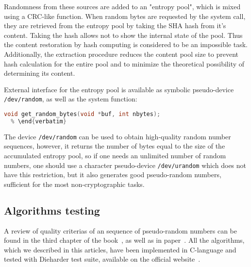 \documentclass[%
floatfix,
showkeys,
nofootinbib, %
superscriptaddress, %
]{revtex4-1}
\begin{document}
Randomness from these sources are added to an "entropy pool", which is
mixed using a CRC-like function. When random bytes are requested by
the system call, they are retrieved from the entropy pool by taking
the SHA hash from it's content. Taking the hash allows not to show the
internal state of the pool. Thus the content restoration by hash
computing is considered to be an impossible task. Additionally, the
extraction procedure reduces the content pool size to prevent hash
calculation for the entire pool and to minimize the theoretical
possibility of determining its content.

External interface for the entropy pool is available as symbolic
pseudo-device \texttt{/dev/random}, as well as the system function:
\begin{lstlisting}[language=C]
  void get_random_bytes(void *buf, int nbytes);
  % \end{verbatim}
\end{lstlisting}
The device \texttt{/dev/random} can be used to obtain high-quality
random number sequences, however, it returns the number of bytes equal
to the size of the accumulated entropy pool, so if one needs an
unlimited number of random numbers, one should use a character
pseudo-device \texttt{/dev/urandom} which does not have this
restriction, but it also generates good pseudo-random numbers,
sufficient for the most non-cryptographic tasks.

\subsection{Algorithms testing}
A review of quality criterias of an sequence of pseudo-random numbers
can be found in the third chapter of the book~\cite{L_DKnuth:1997:en},
as well as in paper~\cite{L_Ecuyer:2007}. All the algorithms, which we
described in this articles, have been implemented in C-language and
tested with Dieharder test suite, available on the official
website~\cite{L_DieHarder:2013}.
\end{document}
